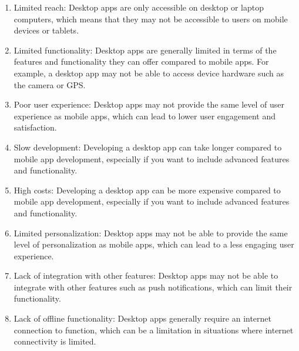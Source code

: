 \documentclass[12pt]{article}
\begin{document}
			\begin{enumerate}
				\item Limited reach: Desktop apps are only accessible on desktop or laptop computers, which means that they may not be accessible to users on mobile devices or tablets.
				\item Limited functionality: Desktop apps are generally limited in terms of the features and functionality they can offer compared to mobile apps. For example, a desktop app may not be able to access device hardware such as the camera or GPS.
				\item Poor user experience: Desktop apps may not provide the same level of user experience as mobile apps, which can lead to lower user engagement and satisfaction.
				\item Slow development: Developing a desktop app can take longer compared to mobile app development, especially if you want to include advanced features and functionality.
				\item High costs: Developing a desktop app can be more expensive compared to mobile app development, especially if you want to include advanced features and functionality.
				\item Limited personalization: Desktop apps may not be able to provide the same level of personalization as mobile apps, which can lead to a less engaging user experience.
				\item Lack of integration with other features: Desktop apps may not be able to integrate with other features such as push notifications, which can limit their functionality.
				\item Lack of offline functionality: Desktop apps generally require an internet connection to function, which can be a limitation in situations where internet connectivity is limited.
			\end{enumerate}
\end{document}
